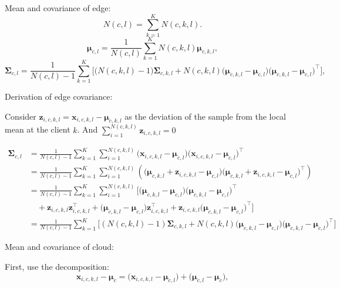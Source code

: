 \documentclass[journal]{IEEEtran}
\begin{document}
Mean and covariance of edge:
\begin{equation}
  N(c,l) = \sum_{k=1}^K N(c,k,l).
\end{equation}
\begin{equation}
    \mathbf{\mu}_{c,l} = \frac{1}{N(c,l)} \sum_{k=1}^K N(c,k,l) \mathbf{\mu}_{c,k,l},
    \end{equation}
\begin{equation}
\mathbf{\Sigma}_{c,l} = \frac{1}{N(c,l)-1} \sum_{k=1}^K \Bigg[
\big( N(c,k,l)-1 \big) \mathbf{\Sigma}_{c,k,l} + N(c,k,l) \big( \mathbf{\mu}_{c,k,l} - \mathbf{\mu}_{c,l} \big) \big( \mathbf{\mu}_{c,k,l} - \mathbf{\mu}_{c,l} \big)^\top
\Bigg],
\end{equation}

Derivation of edge covariance:

Consider \( \mathbf{z}_{i,c,k,l} = \mathbf{x}_{i,c,k,l} - \mathbf{\mu}_{c,k,l} \) as the deviation of the sample from the local mean at the client \(k \). And \(\sum_{i=1}^{N(c,k,l)} \mathbf{z}_{i,c,k,l} = 0  \)

\begin{align*}
  \mathbf{\Sigma}_{c,l} &= \frac{1}{N(c,l)-1} \sum_{k=1}^K \sum_{i=1}^{N(c,k,l)} \big( \mathbf{x}_{i,c,k,l} - \mathbf{\mu}_{c,l} \big) \big( \mathbf{x}_{i,c,k,l} - \mathbf{\mu}_{c,l} \big)^\top \\
  &= \frac{1}{N(c,l)-1} \sum_{k=1}^K \sum_{i=1}^{N(c,k,l)} \left( \big( \mathbf{\mu}_{c,k,l} + \mathbf{z}_{i,c,k,l} - \mathbf{\mu}_{c,l} \big) \big( \mathbf{\mu}_{c,k,l} + \mathbf{z}_{i,c,k,l} - \mathbf{\mu}_{c,l} \big)^\top \right) \\
  &= \frac{1}{N(c,l)-1} \sum_{k=1}^K \sum_{i=1}^{N(c,k,l)} \Bigg[ \big( \mathbf{\mu}_{c,k,l} - \mathbf{\mu}_{c,l} \big) \big( \mathbf{\mu}_{c,k,l} - \mathbf{\mu}_{c,l} \big)^\top \\
  &\quad + \mathbf{z}_{i,c,k,l} \mathbf{z}_{i,c,k,l}^\top + \big( \mathbf{\mu}_{c,k,l} - \mathbf{\mu}_{c,l} \big) \mathbf{z}_{i,c,k,l}^\top + \mathbf{z}_{i,c,k,l} \big( \mathbf{\mu}_{c,k,l} - \mathbf{\mu}_{c,l} \big)^\top \Bigg] \\
  &= \frac{1}{N(c,l)-1} \sum_{k=1}^K \Bigg[ (N(c,k,l)-1) \mathbf{\Sigma}_{c,k,l} + N(c,k,l) \big( \mathbf{\mu}_{c,k,l} - \mathbf{\mu}_{c,l} \big) \big( \mathbf{\mu}_{c,k,l} - \mathbf{\mu}_{c,l} \big)^\top \Bigg]
\end{align*}

Mean and covariance of cloud:

First, use the decomposition:
\begin{equation}
\mathbf{x}_{i,c,k,l} - \mathbf{\mu}_c = \big( \mathbf{x}_{i,c,k,l} - \mathbf{\mu}_{c,l} \big) + \big( \mathbf{\mu}_{c,l} - \mathbf{\mu}_c \big),
\end{equation}
\end{document}
